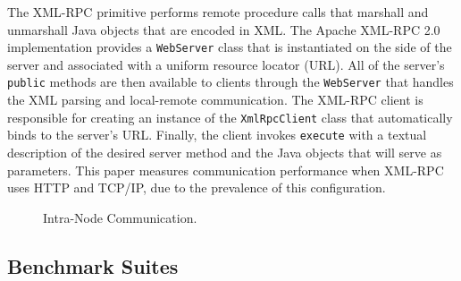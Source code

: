 \documentclass{sig-alternate}
\begin{document}
The XML-RPC primitive performs remote procedure calls that marshall
and unmarshall Java objects that are encoded in XML.  The Apache
XML-RPC 2.0 implementation provides a {\tt WebServer} class that is
instantiated on the side of the server and associated with a uniform
resource locator (URL).  All of the server's {\tt public} methods are
then available to clients through the {\tt WebServer} that handles the
XML parsing and local-remote communication.  The XML-RPC client is
responsible for creating an instance of the {\tt XmlRpcClient} class
that automatically binds to the server's URL. Finally, the client
invokes {\tt execute} with a textual description of the desired server
method and the Java objects that will serve as parameters.  This paper
measures communication performance when XML-RPC uses HTTP and TCP/IP,
due to the prevalence of this configuration.

\begin{figure}

\centering

\linethickness{1.1pt}

\vspace*{.3in}

\caption{Intra-Node Communication.}

\label{fig:intranode-communication}
\end{figure}

\subsection{Benchmark Suites}
\label{sec:benchmarking-suites}







\end{document}
